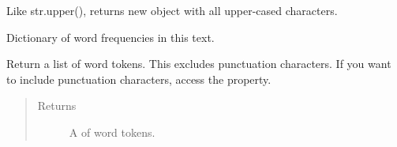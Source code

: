 \documentclass[letterpaper,10pt,english]{sphinxmanual}
\begin{document}
\begin{fulllineitems}

\begin{fulllineitems}
\label{api_reference:textblob_de.blob.Sentence.upper}
Like str.upper(), returns new object with all upper-cased characters.

\end{fulllineitems}


\begin{fulllineitems}
\label{api_reference:textblob_de.blob.Sentence.word_counts}
Dictionary of word frequencies in this text.

\end{fulllineitems}


\begin{fulllineitems}
\label{api_reference:textblob_de.blob.Sentence.words}
Return a list of word tokens. This excludes punctuation characters.
If you want to include punctuation characters, access the 
property.
\begin{quote}\begin{description}
\item[{Returns}] \leavevmode
A {\hyperref[api_reference:textblob_de.blob.WordList]{}} of word tokens.

\end{description}\end{quote}

\end{fulllineitems}


\end{fulllineitems}

\end{document}
